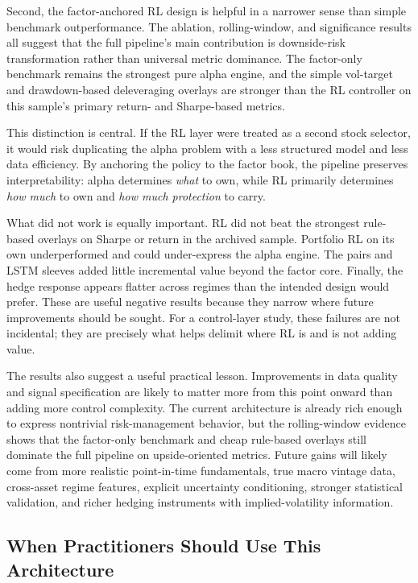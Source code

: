 \documentclass[11pt]{article}
\begin{document}
Second, the factor-anchored RL design is helpful in a narrower sense than simple
benchmark outperformance. The ablation, rolling-window, and significance results
all suggest that the full pipeline's main contribution is downside-risk
transformation rather than universal metric dominance. The factor-only benchmark
remains the strongest pure alpha engine, and the simple vol-target and
drawdown-based deleveraging overlays are stronger than the RL controller on this
sample's primary return- and Sharpe-based metrics.

This distinction is central. If the RL layer were treated as a second stock
selector, it would risk duplicating the alpha problem with a less structured
model and less data efficiency. By anchoring the policy to the factor book, the
pipeline preserves interpretability: alpha determines \emph{what} to own, while
RL primarily determines \emph{how much} to own and \emph{how much protection} to
carry.

What did not work is equally important. RL did not beat the strongest
rule-based overlays on Sharpe or return in the archived sample. Portfolio RL on
its own underperformed and could under-express the alpha engine. The pairs and
LSTM sleeves added little incremental value beyond the factor core. Finally, the
hedge response appears flatter across regimes than the intended design would
prefer. These are useful negative results because they narrow where future
improvements should be sought. For a control-layer study, these failures are not
incidental; they are precisely what helps delimit where RL is and is not adding
value.

The results also suggest a useful practical lesson. Improvements in data quality
and signal specification are likely to matter more from this point onward than
adding more control complexity. The current architecture is already rich enough
to express nontrivial risk-management behavior, but the rolling-window evidence
shows that the factor-only benchmark and cheap rule-based overlays still dominate
the full pipeline on upside-oriented metrics. Future gains will likely come
from more realistic point-in-time fundamentals, true macro vintage data,
cross-asset regime features, explicit uncertainty conditioning, stronger
statistical validation, and richer hedging instruments with implied-volatility
information.

\subsection{When Practitioners Should Use This Architecture}
\end{document}
